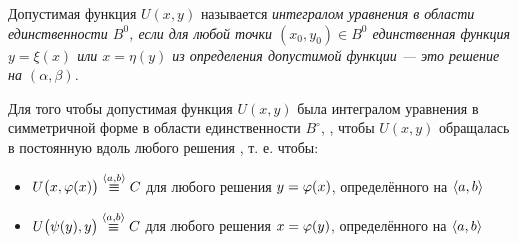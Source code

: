 \begin{definition}
    Допустимая функция $ U(x, y) $ называется \it{интегралом} уравнения  в области единственности $ B^0 $, если для любой точки $ (x_0, y_0) \in B^0 $ единственная функция $ y = \xi(x) $ или $ x = \eta(y) $ из определения допустимой функции --- это решение  на $ (\alpha, \beta) $.
\end{definition}

\begin{theorem}
    Для того чтобы допустимая функция $ U(x, y) $ была интегралом уравнения в симметричной форме  в области единственности $ B^\circ $, , чтобы $ U(x, y) $ обращалась в постоянную вдоль любого решения , т. е. чтобы:
    \begin{itemize}
        \item $ U \big( x, \vphi(x) \big) \overset{\braket{a, b}}\equiv C $ для любого решения $ y = \varphi(x) $, определённого на $ \Braket{a, b} $
        \item $ U \big( \psi(y), y \big) \overset{\braket{a, b}}\equiv C $ для любого решения $ x = \varphi(y) $, определённого на $ \Braket{a, b} $
    \end{itemize}
\end{theorem}

